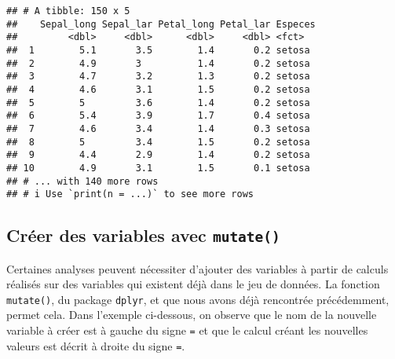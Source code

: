 \documentclass[
  french,
]{book}
\newenvironment{Shaded}{\begin{snugshade}}{\end{snugshade}}
\newcommand{\DataTypeTok}[1]{\textcolor[rgb]{0.13,0.29,0.53}{#1}}
\newcommand{\KeywordTok}[1]{\textcolor[rgb]{0.13,0.29,0.53}{\textbf{#1}}}
\newcommand{\NormalTok}[1]{#1}
\newcommand{\OperatorTok}[1]{\textcolor[rgb]{0.81,0.36,0.00}{\textbf{#1}}}
\newcommand{\StringTok}[1]{\textcolor[rgb]{0.31,0.60,0.02}{#1}}
\begin{document}
\begin{verbatim}
## # A tibble: 150 x 5
##    Sepal_long Sepal_lar Petal_long Petal_lar Especes
##         <dbl>     <dbl>      <dbl>     <dbl> <fct>  
##  1        5.1       3.5        1.4       0.2 setosa 
##  2        4.9       3          1.4       0.2 setosa 
##  3        4.7       3.2        1.3       0.2 setosa 
##  4        4.6       3.1        1.5       0.2 setosa 
##  5        5         3.6        1.4       0.2 setosa 
##  6        5.4       3.9        1.7       0.4 setosa 
##  7        4.6       3.4        1.4       0.3 setosa 
##  8        5         3.4        1.5       0.2 setosa 
##  9        4.4       2.9        1.4       0.2 setosa 
## 10        4.9       3.1        1.5       0.1 setosa 
## # ... with 140 more rows
## # i Use `print(n = ...)` to see more rows
\end{verbatim}

\hypertarget{cruxe9er-des-variables-avec-mutate}{%
\subsection{\texorpdfstring{Créer des variables avec \texttt{mutate()}}{Créer des variables avec mutate()}}\label{cruxe9er-des-variables-avec-mutate}}

Certaines analyses peuvent nécessiter d'ajouter des variables à partir de calculs réalisés sur des variables qui existent déjà dans le jeu de données. La fonction \texttt{mutate()}, du package \texttt{dplyr}, et que nous avons déjà rencontrée précédemment, permet cela. Dans l'exemple ci-dessous, on observe que le nom de la nouvelle variable à créer est à gauche du signe \texttt{=} et que le calcul créant les nouvelles valeurs est décrit à droite du signe \texttt{=}.

\begin{Shaded}
\end{Shaded}
\end{document}
